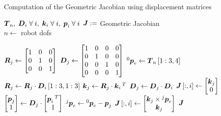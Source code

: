 \begin{algorithm}
\caption{Computation of the Geometric Jacobian using displacement matrices}
\label{alg:jacobian}
\begin{algorithmic}[1]
  \REQUIRE $\boldsymbol{T}_n, \;\boldsymbol{D}_i\;\forall{}\;i, \;\boldsymbol{k}_i\;\forall{}\;i, \;\boldsymbol{p}_i\;\forall{}\;i$
  \ENSURE $\boldsymbol{J} :=$ Geometric Jacobian\\
  \STATE $n \leftarrow$ robot \acp{dof}

  \STATE $\boldsymbol{R}_j \leftarrow \begin{bmatrix}
      1   & 0   & 0  \\
      0   & 1   & 0  \\
      0   & 0   & 1
    \end{bmatrix}$
  \STATE $\boldsymbol{D}_j \leftarrow \begin{bmatrix}
      1   & 0   & 0  & 0  \\
      0   & 1   & 0  & 0  \\
      0   & 0   & 1  & 0  \\
      0   & 0   & 0  & 1    
    \end{bmatrix}$
  \STATE $^0\boldsymbol{p}_e \leftarrow \boldsymbol{T}_n\left[1:3,4\right]$
  \STATE $\boldsymbol{R}_j \leftarrow \boldsymbol{R}_j \cdot \boldsymbol{D}_i\left[1:3,1:3\right]$
  \STATE $\boldsymbol{k}_j \leftarrow \boldsymbol{R}_j \cdot \boldsymbol{k}_i\,^T$
  \STATE $\boldsymbol{D}_j \leftarrow \boldsymbol{D}_j \cdot \boldsymbol{D}_i$
  \STATE $\boldsymbol{J}\left[:,i\right] \leftarrow \begin{bmatrix} \boldsymbol{k}_j \\  0 \end{bmatrix}$
  \STATE $\begin{bmatrix} \boldsymbol{p}_j\\ 1 \end{bmatrix} \leftarrow \boldsymbol{D}_j \cdot \begin{bmatrix} \boldsymbol{p}_i\,^T\\ 1 \end{bmatrix}$
  \STATE ${^j\boldsymbol{p}}_e \leftarrow {^0\boldsymbol{p}}_e - \boldsymbol{p}_j$
  \STATE $\boldsymbol{J}\left[:,i\right] \leftarrow \begin{bmatrix} \boldsymbol{k}_j\times{^j\boldsymbol{p}}_e \\  \boldsymbol{k}_j \end{bmatrix}$
  \ENDIF
  \ENDFOR
  \RETURN $\boldsymbol{J}$
\end{algorithmic}
\end{algorithm}

